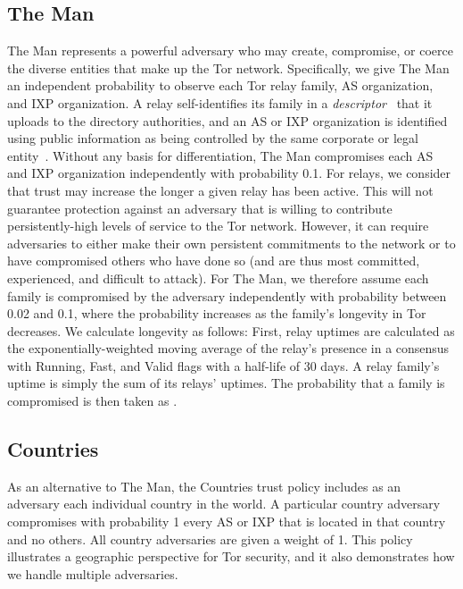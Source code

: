 \documentclass[conference]{styles/IEEEtran}
\begin{document}
\subsection{\textsf{The Man}}
\textsf{The Man} represents a powerful adversary who may create, compromise, or coerce
the diverse entities that make up the Tor network. Specifically, we give \textsf{The Man}
an independent probability to observe each Tor relay family, AS organization, and IXP
organization. A relay self-identifies its family in a \emph{descriptor}~\cite{dir-spec} that it
uploads to the directory authorities, and
an AS or IXP organization is identified using public information as being controlled by the same
corporate or legal entity~\cite{Cai12b,ccs2013-usersrouted}.
Without any basis for differentiation, \textsf{The Man} compromises each AS and IXP organization
independently with probability 0.1. For relays, we consider that trust
may increase the longer a given relay has been active. This will not
guarantee protection against an adversary that is willing to
contribute persistently-high levels of service to the Tor network. However,
it can require adversaries to either make their own persistent
commitments to the network or to have compromised others who
have done so (and are thus most committed, experienced, and difficult to attack).
For \textsf{The Man}, we therefore assume each family
is compromised by the adversary independently with probability between
0.02 and 0.1, where the probability increases as the family's
longevity in Tor decreases. We calculate
longevity as follows: First, relay uptimes are calculated as the exponentially-weighted moving
average of the relay's presence in a consensus with Running, Fast, and Valid
flags with a half-life of 30 days.  A relay family's uptime is simply the sum
of its relays' uptimes. The probability that a family is compromised
is then taken as .

\subsection{\textsf{Countries}}
As an alternative to \textsf{The Man}, the \textsf{Countries} trust policy includes as an
adversary each individual country in the world. A particular country
adversary compromises with probability 1 every AS or IXP that is located in that country
and no others. All country adversaries are given a weight of 1. This policy
illustrates a geographic perspective for Tor security, and it also demonstrates
how we handle multiple adversaries. 
\end{document}
